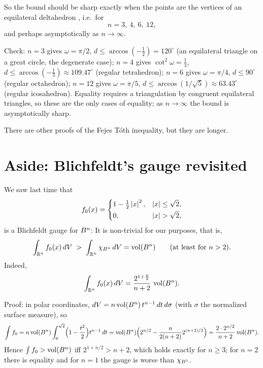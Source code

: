 So the bound should be sharp exactly when the points are the vertices of an equilateral deltahedron
, i.e.\ for
\[
  n = 3,\ 4,\ 6,\ 12,
\]
and perhaps asymptotically as $n\to\infty$.
\begin{addedblock}
Check: $n=3$ gives $\omega=\pi/2$, $d\le\arccos(-\tfrac12)=120^\circ$ (an equilateral triangle on a great circle, the degenerate case);
$n=4$ gives $\cot^2\omega=\tfrac13$, $d\le\arccos(-\tfrac13)\approx109.47^\circ$ (regular tetrahedron);
$n=6$ gives $\omega=\pi/4$, $d\le 90^\circ$ (regular octahedron);
$n=12$ gives $\omega=\pi/5$, $d\le\arccos(1/\sqrt5)\approx 63.43^\circ$ (regular icosahedron).
Equality requires a triangulation by congruent equilateral triangles, so these are the only cases of equality;
as $n\to\infty$ the bound is asymptotically sharp.
\end{addedblock}

There are other proofs of the Fejes T\'oth inequality, but they are longer.

\section{Aside: Blichfeldt's gauge revisited}
\label{L3:sec:aside}

We saw last time that
\begin{equation}\label{L3:eq:f0}
  f_0(x)=\begin{cases} 1-\tfrac12\left\lvert x \right\rvert^2, & \left\lvert x \right\rvert\le\sqrt2,\\[2pt] 0, & \left\lvert x \right\rvert>\sqrt2,\end{cases}
\end{equation}
is a Blichfeldt gauge for $B^n$: 
It is non-trivial for our purposes, that is,
\[
  \int_{\mathbb{R}^n} f_0(x)\,dV \;>\; \int_{\mathbb{R}^n}\chi_{B^n}\,dV=\operatorname{vol}(B^n)
  \qquad\text{(at least for } n>2).
\]
Indeed,
\begin{equation}\label{L3:eq:intf0}
  \int_{\mathbb{R}^n} f_0(x)\,dV=\frac{2^{1+\frac n2}}{n+2}\,\operatorname{vol}(B^n).
\end{equation}
\begin{addedblock}
Proof: in polar coordinates, $dV = n\operatorname{vol}(B^n)\,t^{n-1}\,dt\,d\sigma$ (with $\sigma$ the normalized surface measure), so
\[
  \int f_0 = n\operatorname{vol}(B^n)\int_0^{\sqrt2}\Bigl(1-\frac{t^2}{2}\Bigr)t^{n-1}\,dt
  = \operatorname{vol}(B^n)\Bigl(2^{n/2}-\frac{n}{2(n+2)}2^{(n+2)/2}\Bigr)
  = \frac{2\cdot 2^{n/2}}{n+2}\operatorname{vol}(B^n).
\]
Hence $\int f_0>\operatorname{vol}(B^n)$ iff $2^{1+n/2}>n+2$, which holds exactly for $n\ge3$; for $n=2$ there is equality and for
$n=1$ the gauge is worse than $\chi_{B^1}$.
\end{addedblock}

